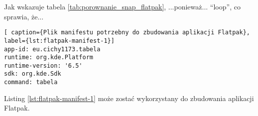 Jak wskazuje tabela \ref{tab:porownanie_snap_flatpak}, ...ponieważ... \enquote{loop}, co sprawia, że...

\vspace{0.5cm}

\begin{lstlisting}[ caption={Plik manifestu potrzebny do zbudowania aplikacji Flatpak}, label={lst:flatpak-manifest-1}]
app-id: eu.cichy1173.tabela
runtime: org.kde.Platform
runtime-version: '6.5'
sdk: org.kde.Sdk
command: tabela
\end{lstlisting}

Listing \ref{lst:flatpak-manifest-1} może zostać wykorzystany do zbudowania aplikacji Flatpak. 